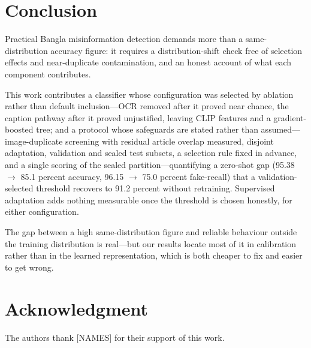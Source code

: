 \documentclass[conference,a4paper]{IEEEtran}
\newif\ifblindsubmission
\begin{document}
\section{Conclusion}

Practical Bangla misinformation detection demands more than a
same-distribution accuracy figure: it requires a distribution-shift check free
of selection effects and near-duplicate contamination, and an honest account of
what each component contributes.

This work contributes a classifier whose configuration was selected by
ablation rather than default inclusion---OCR removed after it proved near
chance, the caption pathway after it proved unjustified, leaving CLIP features
and a gradient-boosted tree; and a protocol whose safeguards are stated rather
than assumed---image-duplicate screening with residual article overlap
measured, disjoint adaptation, validation and sealed test subsets, a selection
rule fixed in advance, and a single scoring of the sealed
partition---quantifying a zero-shot gap (95.38 $\rightarrow$ 85.1 percent
accuracy, 96.15 $\rightarrow$ 75.0 percent fake-recall) that a
validation-selected threshold recovers to 91.2 percent without retraining.
Supervised adaptation adds nothing measurable once the threshold is chosen
honestly, for either configuration.

The gap between a high same-distribution figure and reliable behaviour outside
the training distribution is real---but our results locate most of it in
calibration rather than in the learned representation, which is both cheaper to
fix and easier to get wrong.

\ifblindsubmission\else
\section*{Acknowledgment}
The authors thank [NAMES] for their support of this work.
\fi
\end{document}
